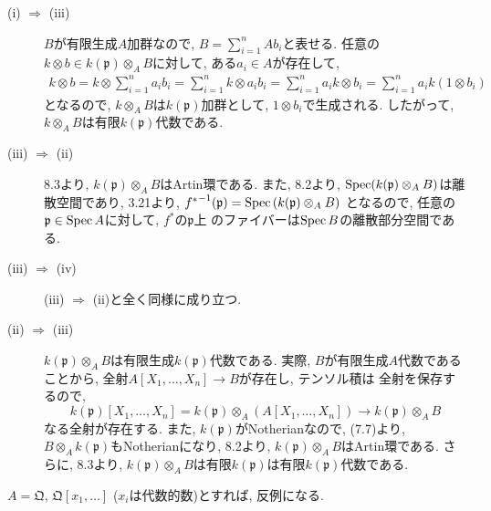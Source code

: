 \documentclass[dvipdfmx]{jsarticle}
\begin{document}
    \begin{problem}
        \begin{description}
            \item[(i) $\Rightarrow$ (iii)]
                $B$が有限生成$A$加群なので, $B = \sum_{i = 1}^n Ab_i$と表せる.
                任意の$k\otimes b \in k(\mathfrak{p}) \otimes_A B$に対して,
                ある$a_i \in A$が存在して,
                \begin{align*}
                    k \otimes  b = k\otimes \sum_{i = 1}^n a_ib_i = \sum_{i = 1}^n k\otimes a_ib_i = \sum_{i = 1}^n a_ik \otimes b_i = \sum_{i = 1}^n a_ik(1\otimes b_i)
                \end{align*}
                となるので, $k\otimes_A B$は$k(\mathfrak{p})$加群として, $1\otimes b_i$で生成される.
                したがって, $k \otimes_A B$は有限$k(\mathfrak{p})$代数である.

            \item [(iii) $\Rightarrow$ (ii)]
                8.3より, $k(\mathfrak{p})\otimes_A B$はArtin環である.
                また, 8.2より, $\operatorname{Spec}(k(\mathfrak{p}) \otimes_A B)$は離散空間であり,
                3.21より, ${f^\ast}^{-1}(\mathfrak{p}) = \operatorname{Spec}{(k(\mathfrak{p}) \otimes_A B)}$
                となるので, 任意の$\mathfrak{p} \in \operatorname{Spec}{A}$に対して, $f^\ast$の$\mathfrak{p}$上
                のファイバーは$\operatorname{Spec}{B}$の離散部分空間である.
            \item [(iii) $\Rightarrow$ (iv)]
                (iii) $\Rightarrow$ (ii)と全く同様に成り立つ.
            \item [(ii) $\Rightarrow$ (iii)]
                $k(\mathfrak{p}) \otimes_A B$は有限生成$k(\mathfrak{p})$代数である.
                実際, $B$が有限生成$A$代数であることから, 全射$A[X_1, \dots, X_n] \to B$が存在し, テンソル積は
                全射を保存するので,
                \[
                    k(\mathfrak{p})[X_1, \dots, X_n] = k(\mathfrak{p}) \otimes_A (A[X_1, \dots, X_n]) \longrightarrow k(\mathfrak{p}) \otimes_A B
                \]
                なる全射が存在する.
                また, $k(\mathfrak{p})$がNotherianなので, (7.7)より, $B\otimes_A k(\mathfrak{p})$もNotherianになり,
                8.2より, $k(\mathfrak{p})\otimes_A B$はArtin環である.
                さらに, 8.3より, $k(\mathfrak{p}) \otimes_A B$は有限$k(\mathfrak{p})$は有限$k(\mathfrak{p})$代数である.
        \end{description}

        $A = \mathfrak{Q}$, $\mathfrak{Q}[x_1, \dots]$ ($x_i$は代数的数)とすれば, 反例になる.
    \end{problem}
\end{document}
